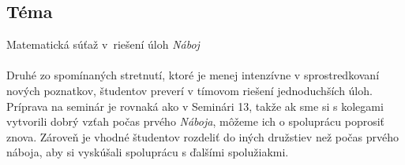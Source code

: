 
\subsection*{Téma}
Matematická súťaž v~riešení úloh \textit{Náboj}\\
\\
\kom Druhé zo spomínaných stretnutí, ktoré je menej intenzívne v sprostredkovaní nových poznatkov, študentov preverí v tímovom riešení jednoduchších úloh. Príprava na seminár je rovnaká ako v Seminári 13, takže ak sme si s kolegami vytvorili dobrý vzťah počas prvého \textit{Náboja}, môžeme ich o spoluprácu poprosiť znova. Zároveň je vhodné študentov rozdeliť do iných družstiev než počas prvého náboja, aby si vyskúšali spoluprácu s ďalšími spolužiakmi.
